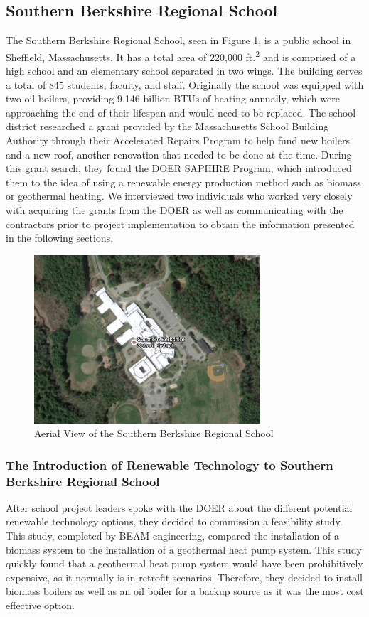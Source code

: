 \subsection{Southern Berkshire Regional School}
\par The Southern Berkshire Regional School, seen in Figure \ref{fig:sbrs}, is a public school in Sheffield, Massachusetts. It has a total area of 220,000 ft.\textsuperscript{2} and is comprised of a high school and an elementary school separated in two wings. The building serves a total of 845 students, faculty, and staff. Originally the school was equipped with two oil boilers, providing 9.146 billion BTUs of heating annually, which were approaching the end of their lifespan and would need to be replaced. The school district researched a grant provided by the Massachusetts School Building Authority through their Accelerated Repairs Program to help fund new boilers and a new roof, another renovation that needed to be done at the time. During this grant search, they found the DOER SAPHIRE Program, which introduced them to the idea of using a renewable energy production method such as biomass or geothermal heating. We interviewed two individuals who worked very closely with acquiring the grants from the DOER as well as communicating with the contractors prior to project implementation to obtain the information presented in the following sections.
\begin{figure}[H]
\centering
\includegraphics[width=0.75\textwidth]{findingschapter/southernberkshireschool}
\caption{Aerial View of the Southern Berkshire Regional School}
\label{fig:sbrs}
\end{figure}

\subsubsection{The Introduction of Renewable Technology to Southern Berkshire Regional School}
\par After school project leaders spoke with the DOER about the different potential renewable technology options, they decided to commission a feasibility study. This study, completed by BEAM engineering, compared the installation of a biomass system to the installation of a geothermal heat pump system. This study quickly found that a geothermal heat pump system would have been prohibitively expensive, as it normally is in retrofit scenarios.  Therefore, they decided to install biomass boilers as well as an oil boiler for a backup source as it was the most cost effective option.


